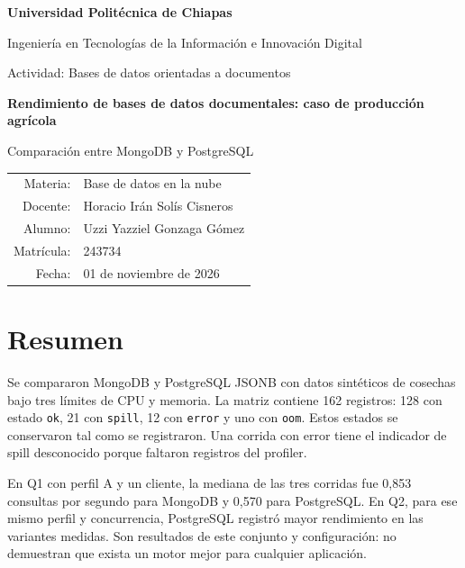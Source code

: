 \documentclass[12pt,letterpaper]{article}
\begin{document}
\begin{titlepage}\centering
{\Large\bfseries Universidad Politécnica de Chiapas\par}\vspace{0.5cm}
{\large Ingeniería en Tecnologías de la Información e Innovación Digital\par}
\vfill
{\large Actividad: Bases de datos orientadas a documentos\par}\vspace{0.9cm}
{\LARGE\bfseries Rendimiento de bases de datos documentales: caso de producción agrícola\par}\vspace{0.5cm}
{\large Comparación entre MongoDB y PostgreSQL\par}
\vfill
\begin{tabular}{rl}
Materia: & Base de datos en la nube \\
Docente: & Horacio Irán Solís Cisneros \\
Alumno: & Uzzi Yazziel Gonzaga Gómez \\
Matrícula: & 243734 \\
Fecha: & 01 de noviembre de 2026
\end{tabular}
\vspace{2cm}\end{titlepage}
\tableofcontents\clearpage\listoftables\listoffigures\clearpage{}

\section*{Resumen}
Se compararon MongoDB y PostgreSQL JSONB con datos sintéticos de cosechas bajo tres límites de CPU y memoria. La matriz contiene 162 registros: 128 con estado \texttt{ok}, 21 con \texttt{spill}, 12 con \texttt{error} y uno con \texttt{oom}. Estos estados se conservaron tal como se registraron. Una corrida con error tiene el indicador de spill desconocido porque faltaron registros del profiler.

En Q1 con perfil A y un cliente, la mediana de las tres corridas fue 0,853 consultas por segundo para MongoDB y 0,570 para PostgreSQL. En Q2, para ese mismo perfil y concurrencia, PostgreSQL registró mayor rendimiento en las variantes medidas. Son resultados de este conjunto y configuración: no demuestran que exista un motor mejor para cualquier aplicación.
\end{document}

